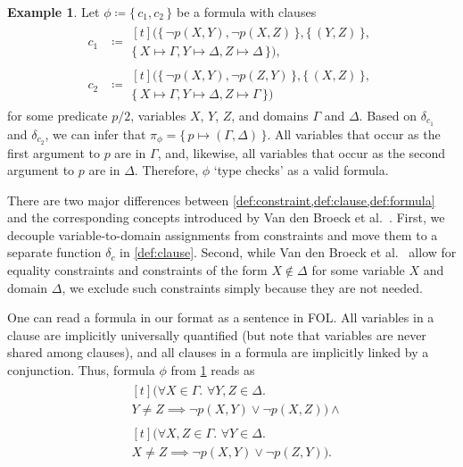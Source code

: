 \documentclass{article}
\theoremstyle{definition}
\newtheorem{example}{Example}
\begin{document}
\begin{example}\label{example:first}
  Let $\phi \coloneqq \{\, c_1, c_2 \,\}$ be a formula with clauses
  \begin{align*}
    c_1 &\coloneqq
          \begin{multlined}[t]
            (\{\, \neg p(X, Y), \neg p(X, Z) \,\}, \{\, (Y, Z) \,\}, \\
            \{\, X \mapsto \Gamma, Y \mapsto \Delta, Z \mapsto \Delta \,\}),
          \end{multlined}\\
    c_2 &\coloneqq
          \begin{multlined}[t]
            (\{\, \neg p(X, Y), \neg p(Z, Y) \,\}, \{\, (X, Z) \,\}, \\
            \{\, X \mapsto \Gamma, Y \mapsto \Delta, Z \mapsto \Gamma \,\})
          \end{multlined}
  \end{align*}
  for some predicate $p/2$, variables $X$, $Y$, $Z$, and domains $\Gamma$ and
  $\Delta$. Based on $\delta_{c_{1}}$ and $\delta_{c_{2}}$, we can infer that
  $\pi_{\phi} = \{\, p \mapsto (\Gamma, \Delta) \,\}$. All variables that occur
  as the first argument to $p$ are in $\Gamma$, and, likewise, all variables
  that occur as the second argument to $p$ are in $\Delta$. Therefore, $\phi$
  `type checks' as a valid formula.
\end{example}

There are two major differences between
\cref{def:constraint,def:clause,def:formula} and the corresponding concepts
introduced by Van den Broeck et al.~.
First, we decouple variable-to-domain assignments from constraints and move them
to a separate function $\delta_{c}$ in \cref{def:clause}. Second, while Van den
Broeck et al.~ allow for equality
constraints and constraints of the form $X \not\in \Delta$ for some variable $X$
and domain $\Delta$, we exclude such constraints simply because they are not
needed.

One can read a formula in our format as a sentence in FOL\@. All variables in a
clause are implicitly universally quantified (but note that variables are never
shared among clauses), and all clauses in a formula are implicitly linked by a
conjunction. Thus, formula $\phi$ from \cref{example:first} reads as
\begin{align*}
  &\begin{multlined}[t]
    (\forall X \in \Gamma\text{. }\forall Y, Z \in \Delta\text{. }\\
    Y \ne Z \implies \neg p(X, Y) \lor \neg p(X, Z)) \land
    \end{multlined}\\
  &\begin{multlined}[t]
    (\forall X, Z \in \Gamma\text{. }\forall Y \in \Delta\text{. }\\
    X \ne Z \implies \neg p(X, Y) \lor \neg p(Z, Y)).
    \end{multlined}
\end{align*}
\end{document}
